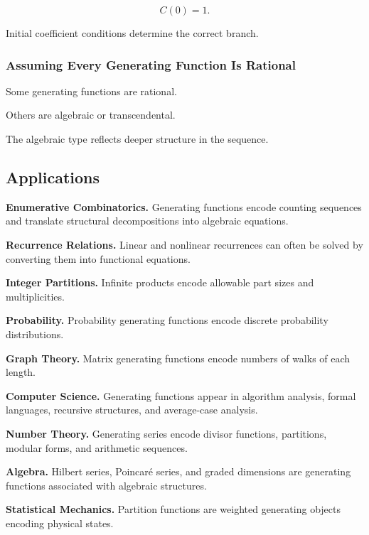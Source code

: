 \[
C(0)=1.
\]

Initial coefficient conditions determine the correct branch.

\subsubsection{Assuming Every Generating Function Is Rational}

Some generating functions are rational.

Others are algebraic or transcendental.

The algebraic type reflects deeper structure in the sequence.

\subsection{Applications}
\label{subsec:generating-functions-applications}

\begin{applicationbox}

\textbf{Enumerative Combinatorics.}
Generating functions encode counting sequences and translate structural
decompositions into algebraic equations.

\medskip

\textbf{Recurrence Relations.}
Linear and nonlinear recurrences can often be solved by converting them
into functional equations.

\medskip

\textbf{Integer Partitions.}
Infinite products encode allowable part sizes and multiplicities.

\medskip

\textbf{Probability.}
Probability generating functions encode discrete probability
distributions.

\medskip

\textbf{Graph Theory.}
Matrix generating functions encode numbers of walks of each length.

\medskip

\textbf{Computer Science.}
Generating functions appear in algorithm analysis, formal languages,
recursive structures, and average-case analysis.

\medskip

\textbf{Number Theory.}
Generating series encode divisor functions, partitions, modular forms,
and arithmetic sequences.

\medskip

\textbf{Algebra.}
Hilbert series, Poincaré series, and graded dimensions are generating
functions associated with algebraic structures.

\medskip

\textbf{Statistical Mechanics.}
Partition functions are weighted generating objects encoding physical
states.

\end{applicationbox}

